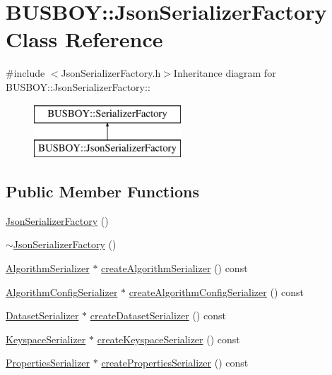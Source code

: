 \hypertarget{classBUSBOY_1_1JsonSerializerFactory}{
\section{BUSBOY::JsonSerializerFactory Class Reference}
\label{classBUSBOY_1_1JsonSerializerFactory}
}


{\ttfamily \#include $<$JsonSerializerFactory.h$>$}Inheritance diagram for BUSBOY::JsonSerializerFactory::\begin{figure}[H]
\begin{center}
\leavevmode
\includegraphics[height=2cm]{classBUSBOY_1_1JsonSerializerFactory}
\end{center}
\end{figure}
\subsection*{Public Member Functions}
\begin{DoxyCompactItemize}
\item 
\hyperlink{classBUSBOY_1_1JsonSerializerFactory_aebb40b1fcb1c98099f7d2836fc0e8192}{JsonSerializerFactory} ()
\item 
\hyperlink{classBUSBOY_1_1JsonSerializerFactory_ab1a476923261a86ad9536cebfc8a4c0e}{$\sim$JsonSerializerFactory} ()
\item 
\hyperlink{classBUSBOY_1_1AlgorithmSerializer}{AlgorithmSerializer} $\ast$ \hyperlink{classBUSBOY_1_1JsonSerializerFactory_a575cec17e9b4dffa5eba3f7747414d89}{createAlgorithmSerializer} () const 
\item 
\hyperlink{classBUSBOY_1_1AlgorithmConfigSerializer}{AlgorithmConfigSerializer} $\ast$ \hyperlink{classBUSBOY_1_1JsonSerializerFactory_a54d006f2e2a308e12ce60a418cea0436}{createAlgorithmConfigSerializer} () const 
\item 
\hyperlink{classBUSBOY_1_1DatasetSerializer}{DatasetSerializer} $\ast$ \hyperlink{classBUSBOY_1_1JsonSerializerFactory_a59e34529797620296dcbb69352bdd2ca}{createDatasetSerializer} () const 
\item 
\hyperlink{classBUSBOY_1_1KeyspaceSerializer}{KeyspaceSerializer} $\ast$ \hyperlink{classBUSBOY_1_1JsonSerializerFactory_a1bab634e3e3e407b413f875579b8b16c}{createKeyspaceSerializer} () const 
\item 
\hyperlink{classBUSBOY_1_1PropertiesSerializer}{PropertiesSerializer} $\ast$ \hyperlink{classBUSBOY_1_1JsonSerializerFactory_aa93357994dab0bf30dca30e00959eb2d}{createPropertiesSerializer} () const 
\end{DoxyCompactItemize}


